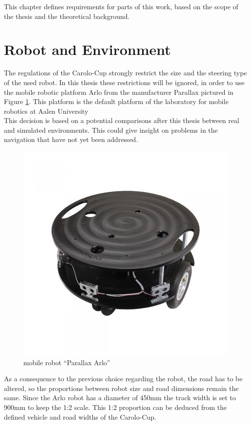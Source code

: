 This chapter defines requirements for parts of this work, based on the scope of the thesis and the theoretical background.

\section{Robot and Environment}

The regulations of the Carolo-Cup strongly restrict the size and the steering type of the used robot. In this thesis these restrictions will be ignored, in order to use the mobile robotic platform Arlo from the manufacturer Parallax pictured in Figure \ref{arlore}. This platform is the default platform of the laboratory for mobile robotics at Aalen University\\

This decision is based on a potential comparisons after this thesis between real and simulated environments. This could give insight on problems in the navigation that have not yet been addressed.\\


\begin{figure}[H]
	\centering
	\includegraphics[width=.7\textwidth]{arlo real}
	
	\caption{mobile robot ``Parallax Arlo'' \cite{arloreal}}
	\label{arlore}
\end{figure}

As a consequence to the previous choice regarding the robot, the road has to be altered, so the proportions between robot size and road dimensions remain the same. Since the Arlo robot has a diameter of 450mm the track width is set to 900mm to keep the 1:2 scale. This 1:2 proportion can be deduced from the defined vehicle and road widths of the Carolo-Cup\cite{carolocup}.

